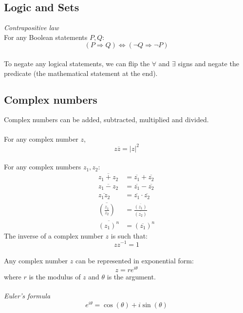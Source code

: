 \documentclass{scrartcl}
\begin{document}
\subsection{Logic and Sets}
\textit{Contrapositive law}
\\
For any Boolean statements $ P, Q $:
\begin{equation}
(P \Rightarrow Q) \Leftrightarrow (\neg Q \Rightarrow \neg P)
\end{equation}
\\
To negate any logical statements, we can flip the $ \forall $ and $ \exists $ signs and negate the predicate (the mathematical statement at the end).

\subsection{Complex numbers}
Complex numbers can be added, subtracted, multiplied and divided.
\\\\
For any complex number $ z $,
\begin{equation}
z \overline{z} = |z| ^{2}
\end{equation}
\\
For any complex numbers $ z_{1}, z_{2} $:
\begin{align}
\overline{z_{1} + z_{2}} & = \overline{z_{1}} + \overline{z_{2}} \\
\overline{z_{1} - z_{2}} & = \overline{z_{1}} - \overline{z_{2}} \\
\overline{z_{1} z_{2}} & = \overline{z_{1}} \cdot \overline{z_{2}} \\
\overline{(\frac{z_{1}}{z_{2}})} & = \frac{\overline{(z_{1})}}{\overline{(z_{2})}} \\
\overline{(z_{1})^{n}} & = (\overline{z_{1}})^{n}
\end{align}
The inverse of a complex number $ z $ is such that:
\begin{equation}
z z^{-1} = 1
\end{equation}
\\
Any complex number $ z $ can be represented in exponential form:
\begin{equation}
z = r e^{i \theta}
\end{equation}
where $ r $ is the modulus of $ z $ and $ \theta $ is the argument.
\\\\
\textit{Euler's formula}
\begin{equation}
e^{i \theta} = \cos(\theta) + i \sin(\theta)
\end{equation}
\end{document}
